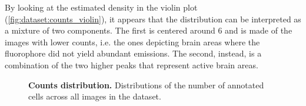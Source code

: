 By looking at the estimated density in the violin plot (\cref{fig:dataset:counts_violin}), it appears that the distribution can be interpreted as a mixture of two components.
The first is centered around 6 and is made of the images with lower counts, i.e. the ones depicting brain areas where the fluorophore did not yield abundant emissions.
The second, instead, is a combination of the two higher peaks that represent active brain areas.
\begin{figure}
    \centering
    \caption{\textbf{Counts distribution.} Distributions of the number of annotated cells across all images in the dataset.}
    \label{fig:dataset:counts_distrib}
\end{figure}